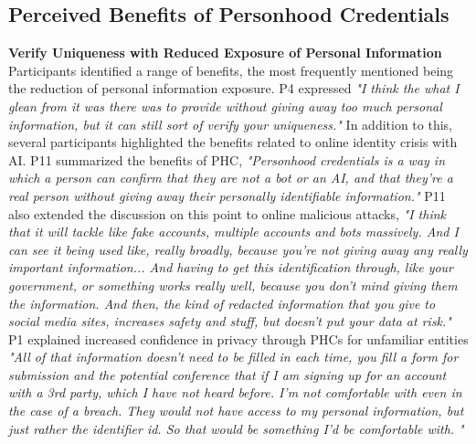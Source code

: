 

\subsection{Perceived Benefits of Personhood Credentials}
\textbf{Verify Uniqueness with Reduced Exposure of Personal Information} Participants identified a range of benefits, the most frequently mentioned being the reduction of personal information exposure. P4 expressed \textit{"I think the what I glean from it was there was to provide without giving away too much personal information, but it can still sort of verify your uniqueness."} In addition to this, several participants highlighted the benefits related to online identity crisis with AI. P11 summarized the benefits of PHC, \textit{"Personhood credentials is a way in which a person can confirm that they are not a bot or an AI, and that they're a real person without giving away their personally identifiable information."} P11 also extended the discussion on this point to online malicious attacks, \textit{"I think that it will tackle like fake accounts, multiple accounts and bots massively. And I can see it being used like, really broadly, because you're not giving away any really important information... And having to get this identification through, like your government, or something works really well, because you don't mind giving them the information. And then, the kind of redacted information that you give to social media sites, increases safety and stuff, but doesn't put your data at risk."} P1 explained increased confidence in privacy through PHCs for unfamiliar entities \textit{"All of that information doesn't need to be filled in each time, you fill a form for submission and the potential conference that if I am signing up for an account with a 3rd party, which I have not heard before. I'm not comfortable with even in the case of a breach. They would not have access to my personal information, but just rather the identifier id. So that would be something I'd be comfortable with. "}

